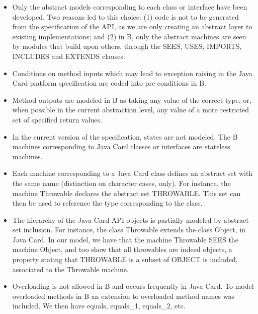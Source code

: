 \documentclass{entcs}
\begin{document}
\begin{itemize}

\item Only the abstract models corresponding to each class or
  interface have been developed. Two reasons led to this choice: (1)
  code is not to be generated from the specification of the API, as we
  are only creating an abstract layer to existing implementations; and
  (2) in B, only the abstract machines are seen by modules that build
  upon others, through the SEES, USES, IMPORTS, INCLUDES and EXTENDS
  clauses.

\item Conditions on method inputs which may lead to exception raising
  in the Java Card platform specification are coded into
  pre-conditions in B.
  
\item Method outputs are modeled in B as taking any value of the
  correct type, or, when possible in the current abstraction level,
  any value of a more restricted set of specified return values.
  
  \item In the current version of the specification, states are not modeled. 
  The B machines corresponding to Java Card classes or interfaces are stateless machines. 
  
\item Each machine corresponding to a Java Card class defines an
  abstract set with the same name (distinction on character cases,
  only). For instance, the machine Throwable declares the abstract set
  THROWABLE. This set can then be used to reference the type
  corresponding to the class.

\item The hierarchy of the Java Card API objects is partially modeled
  by abstract set inclusion. For instance, the class Throwable extends
  the class Object, in Java Card. In our model, we  have that the
  machine Throwable SEES the machine Object, and too show that all throwables are indeed
  objects, a property stating that THROWABLE is a subset of OBJECT is
  included, associated to the Throwable machine.

\item Overloading is not allowed in B and occurs frequently in Java
  Card. To model overloaded methods in B an extension to overloaded
  method names was included. We then have equals, equals\_1,
  equals\_2, etc.
\end{itemize}
\end{document}
